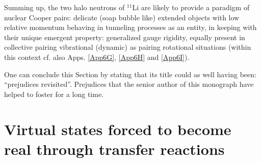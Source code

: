 Summing up, the two halo neutrons of $^{11}$Li are likely to provide a paradigm of nuclear Cooper pairs: delicate (soap bubble like) extended objects with low relative momentum behaving in tunneling processes as an entity, in keeping with their unique emergent property: generalized gauge rigidity, equally present in collective pairing vibrational (dynamic) as pairing rotational situations (within this context cf. also Apps. \ref{App6G}, \ref{App6H} and \ref{App6I}).



One can conclude this Section by stating that its title could as well having been:  ``prejudices revisited''. Prejudices that the senior author of this monograph have helped to foster for a long time.
\section{Virtual states forced to become real through transfer reactions}\label{C6S4}




